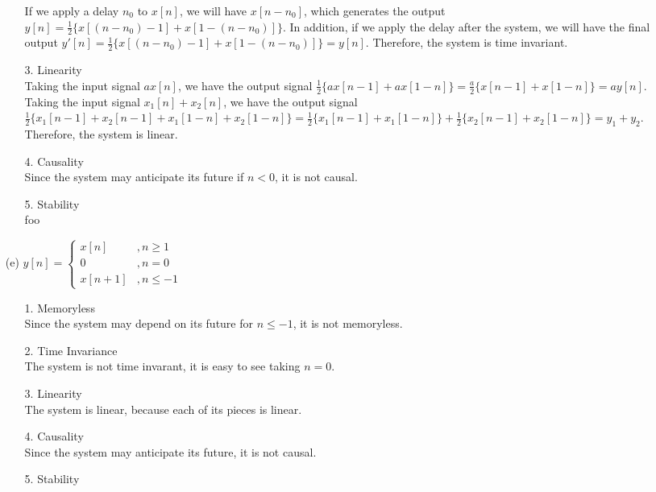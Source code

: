 \documentclass{article}
\begin{document}
\begin{enumerate}
\begin{enumerate}
                If we apply a delay $n_{0}$ to $x[n]$, we will have $x[n-n_{0}]$, which generates the output $y[n] = \frac{1}{2}\{x[(n-n_{0})-1]+x[1-(n-n_{0})]\}$. In addition, if we apply the delay after the system, we will have the final output $y'[n] = \frac{1}{2}\{x[(n-n_{0})-1]+x[1-(n-n_{0})]\} = y[n]$. Therefore, the system is time invariant.
            \item[3.] Linearity \\ 
                Taking the input signal $ax[n]$, we have the output signal $\frac{1}{2}\{ax[n-1]+ax[1-n]\} = \frac{a}{2}\{x[n-1]+x[1-n]\} = ay[n]$. \\
                Taking the input signal $x_{1}[n]+x_{2}[n]$, we have the output signal $\frac{1}{2}\{x_{1}[n-1]+x_{2}[n-1]+x_{1}[1-n]+x_{2}[1-n]\} = \frac{1}{2}\{x_{1}[n-1]+x_{1}[1-n]\} + \frac{1}{2}\{x_{2}[n-1]+x_{2}[1-n]\} = y_{1}+y_{2}$. \\
                Therefore, the system is linear.
            \item[4.] Causality \\
                Since the system may anticipate its future if $n<0$, it is not causal.
            \item[5.] Stability \\
                foo
        \end{enumerate}
    \item[(e)] $y[n] = \left\{ \begin{array}{cl}
    x[n] &, n\geq 1  \\
    0 &, n = 0 \\
    x[n+1] &, n \leq -1
    \end{array} \right.$
        \begin{enumerate}
            \item[1.] Memoryless \\
            Since the system may depend on its future for $n\leq -1$, it is not memoryless.
            \item[2.] Time Invariance \\
                The system is not time invarant, it is easy to see taking $n=0$.
            \item[3.] Linearity \\ 
                The system is linear, because each of its pieces is linear.
            \item[4.] Causality \\
                Since the system may anticipate its future, it is not causal.
            \item[5.] Stability \\

\end{enumerate}
\end{enumerate}
\end{document}
